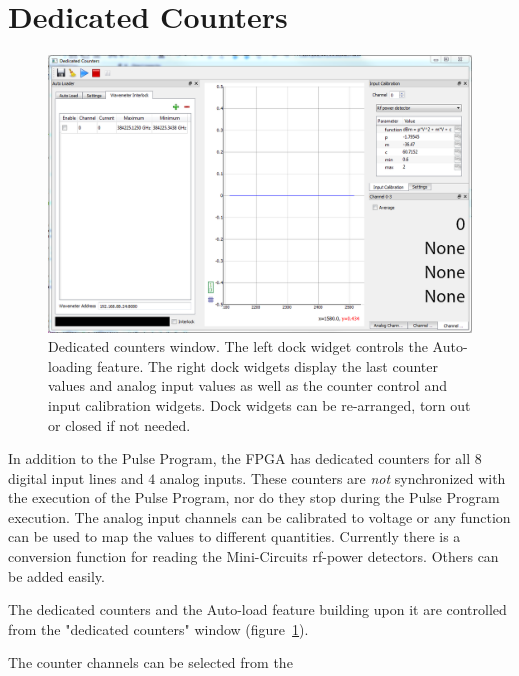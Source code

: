 \documentclass[11pt]{scrartcl}
\begin{document}
\section{Dedicated Counters}
\begin{figure}[htbp]
\begin{center}
\includegraphics[width=\textwidth]{DedicatedCounters}
\end{center}
\caption{\label{DedicatedCounters} Dedicated counters window. The left dock widget controls the Auto-loading feature. The right dock widgets display the last counter values and analog input values as well as the counter control and input calibration widgets. Dock widgets can be re-arranged, torn out or closed if not needed. }
\end{figure}
In addition to the Pulse Program, the FPGA has dedicated counters for all $8$ digital input lines and $4$ analog inputs. These counters are {\em not} synchronized with the execution of the Pulse Program, nor do they stop during the Pulse Program execution. The analog input channels can be calibrated to voltage or any function can be used to map the values to different quantities. Currently there is a conversion function for reading the Mini-Circuits rf-power detectors. Others can be added easily.

The dedicated counters and  the Auto-load feature building upon it are controlled from the "dedicated counters" window (figure~\ref{DedicatedCounters}). 

The counter channels can be selected from the 
\end{document}
